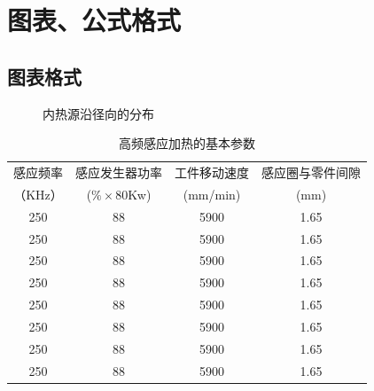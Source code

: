 \section{图表、公式格式}
\subsection{图表格式}

\begin{figure}[htb] 
\caption{内热源沿径向的分布}
\end{figure}

\begin{table}[!htbp]
\centering
\caption{高频感应加热的基本参数}
\begin{tabular}{|c| c|c|c|}
\hline
感应频率 &感应发生器功率 & 工件移动速度  &感应圈与零件间隙\\
（KHz）&($\% \times$80Kw) &(mm/min)  &(mm)\\
\hline
250 &88 &5900 &1.65\\
\hline
250 &88 &5900 &1.65\\
\hline
250 &88 &5900 &1.65\\
\hline
250 &88 &5900 &1.65\\
\hline
250 &88 &5900 &1.65\\
\hline
250 &88 &5900 &1.65\\
\hline
250 &88 &5900 &1.65\\
\hline
250 &88 &5900 &1.65\\
\hline
\end{tabular}
\end{table}

